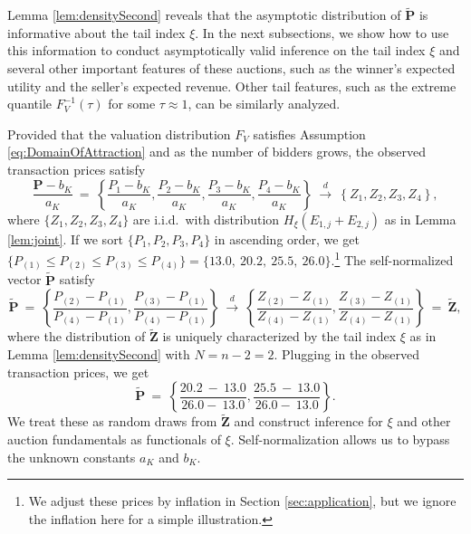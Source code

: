 Lemma \ref{lem:densitySecond} reveals that the asymptotic distribution of $\mathbf{\tilde{P}}$ is informative about the tail index $\xi $. In the next subsections, we show how to use this information to conduct asymptotically valid inference on the tail index $\xi $ and several other important features of these auctions, such as the winner's expected utility and the seller's expected revenue. Other tail features, such as the extreme quantile $F_{V}^{-1}(\tau)$ for some $\tau \approx 1$, can be similarly analyzed.  

\begin{runningexamplecont}
Provided that the valuation distribution $F_V$ satisfies Assumption \eqref{eq:DomainOfAttraction} and as the number of bidders grows, the observed transaction prices satisfy
\begin{equation*}
    \frac{\mathbf{P}-b_K}{a_K}~=~ \left\{\frac{P_1-b_K}{a_K},\frac{P_2-b_K}{a_K},\frac{P_3-b_K}{a_K},\frac{P_4-b_K}{a_K}\right\} ~\overset{d}{\to }~ \left\{Z_1,Z_2,Z_3,Z_4 \right\},
\end{equation*}
where $\{Z_1,Z_2,Z_3,Z_4 \}$ are i.i.d.\ with distribution $H_{\xi}(E_{1,j}+E_{2,j})$ as in Lemma \ref{lem:joint}. If we sort $\{P_1,P_2,P_3,P_4\}$ in ascending order, we get $\{P_{(1)}\leq P_{(2)}\leq P_{(3)} \leq P_{(4)}\}= \{13.0,~ 20.2,~ 25.5,~ 26.0\}$.\footnote{We adjust these prices by inflation in Section \ref{sec:application}, but we ignore the inflation here for a simple illustration.}
The self-normalized vector $\tilde{\mathbf{P}}$ satisfy
\begin{equation*}
\tilde{\mathbf{P}} ~=~ \left\{\frac{P_{(2)}-P_{(1)}}{P_{(4)}-P_{(1)}},\frac{P_{(3)}-P_{(1)}}{P_{(4)}-P_{(1)}}\right\}~\overset{d}{\to }~\left\{\frac{Z_{(2)}-Z_{(1)}}{Z_{(4)}-Z_{(1)}},\frac{Z_{(3)}-Z_{(1)}}{Z_{(4)}-Z_{(1)}}\right\} ~=~ \tilde{\mathbf{Z}},
\end{equation*}
where the distribution of $\tilde{\mathbf{Z}}$ is uniquely characterized by the tail index $\xi$ as in Lemma \ref{lem:densitySecond} with $N=n-2=2$. 
Plugging in the observed transaction prices, we get
\begin{equation*}
\tilde{\mathbf{P}} ~=~ \left\{\frac{20.2~-~13.0}{26.0-~13.0},\frac{25.5~-~13.0}{26.0-~13.0}\right\}.
\end{equation*}
We treat these as random draws from $\tilde{\mathbf{Z}}$ and construct inference for $\xi$ and other auction fundamentals as functionals of $\xi$. Self-normalization allows us to bypass the unknown constants $a_K$ and $b_K$.
\end{runningexamplecont}

